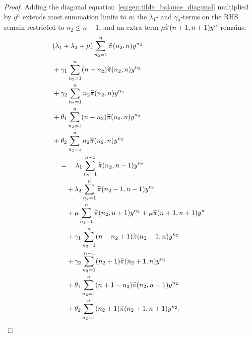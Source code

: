 \begin{proof}
    Adding the diagonal equation~\eqref{eq:gen:tilde_balance_diagonal} multiplied by $y^n$ extends most summation limits to $n$; the $\lambda_1$- and $\gamma_2$-terms on the RHS remain restricted to $n_2\le n-1$, and an extra term $\mu\widetilde{\pi}(n+1,n+1)y^n$ remains:
    \begin{align*}
        \begin{split}
            & (\lambda_1+\lambda_2+\mu) \sum_{n_2=1}^{n} \widetilde{\pi}(n_2,n) y^{n_2} \\
            & + \gamma_1 \sum_{n_2=1}^{n} (n-n_2) \widetilde{\pi}(n_2,n) y^{n_2} \\
            & + \gamma_2 \sum_{n_2=1}^{n} n_2 \widetilde{\pi}(n_2,n) y^{n_2} \\
            & + \theta_1 \sum_{n_2=1}^{n} (n-n_2) \widetilde{\pi}(n_2,n) y^{n_2} \\
            & + \theta_2 \sum_{n_2=1}^{n} n_2 \widetilde{\pi}(n_2,n) y^{n_2} \\
            & \quad = \quad \lambda_1 \sum_{n_2=1}^{n-1} \widetilde{\pi}(n_2,n-1) y^{n_2} \\
            & \quad \quad + \lambda_2 \sum_{n_2=1}^{n} \widetilde{\pi}(n_2-1,n-1) y^{n_2} \\
            & \quad \quad + \mu \sum_{n_2=1}^{n} \widetilde{\pi}(n_2,n+1) y^{n_2} + \mu \widetilde{\pi}(n+1,n+1) y^n \\
            & \quad \quad + \gamma_1 \sum_{n_2=1}^{n} (n-n_2+1) \widetilde{\pi}(n_2-1,n) y^{n_2} \\
            & \quad \quad + \gamma_2 \sum_{n_2=1}^{n-1} (n_2+1) \widetilde{\pi}(n_2+1,n) y^{n_2} \\
            & \quad \quad + \theta_1 \sum_{n_2=1}^{n} (n+1-n_2) \widetilde{\pi}(n_2,n+1) y^{n_2} \\
            & \quad \quad + \theta_2 \sum_{n_2=1}^{n} (n_2+1) \widetilde{\pi}(n_2+1,n+1) y^{n_2}.
        \end{split}
    \end{align*}


\end{proof}
